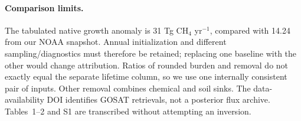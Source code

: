 \documentclass[11pt]{article}
\begin{document}
\paragraph{Comparison limits.} The tabulated native growth anomaly is 31
Tg CH$_4$ yr$^{-1}$, compared with 14.24 from our NOAA snapshot. Annual
initialization and different sampling/diagnostics must therefore be retained;
replacing one baseline with the other would change attribution. Ratios of
rounded burden and removal do not exactly equal the separate lifetime
column, so we use one internally consistent pair of inputs. Other removal
combines chemical and soil sinks. The data-availability DOI identifies GOSAT
retrievals, not a posterior flux archive. Tables~1--2 and S1 are transcribed
without attempting an inversion.
\end{document}
